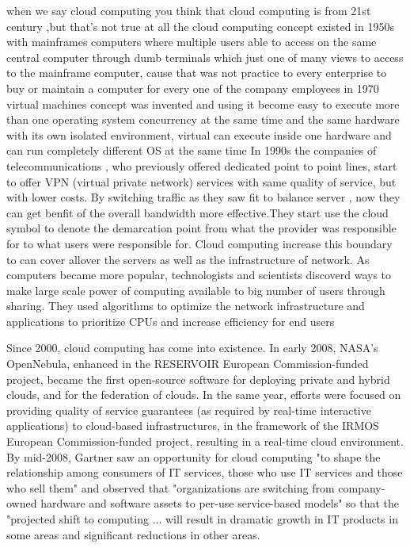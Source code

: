 \documentclass [12pt]{book}
\begin{document}
    
    when we say cloud computing you think that cloud computing is from 21st century ,but that's not true at all the cloud computing concept existed in 1950s with mainframes computers where multiple users able to access on the same central computer through dumb terminals which just one of many views to access to the mainframe computer, cause that was not practice to every enterprise to buy or maintain a computer for every one of the company employees 
  \newline
  \newline
  \newline
    in 1970 virtual machines concept was invented and using it become easy to execute more than one operating system concurrency at the same time and the same hardware with its own isolated environment, virtual can execute inside one hardware and can run completely different OS at the same time 
    \newline
    \newline
    \newline
    In 1990s the companies of  telecommunications , who previously offered  dedicated point to point lines, start to offer VPN  (virtual private network)  services with same quality of service, but with lower costs. By switching traffic as they saw fit to balance server , now they can get benfit of the overall bandwidth more effective.They start use the cloud symbol to denote the demarcation point from what the provider was responsible for to  what users were responsible for. Cloud computing increase this boundary to can  cover allover the servers as well as the  infrastructure of network. As computers became more popular, technologists and scientists discoverd ways to make large scale power of computing  available to big number of users through sharing. They used algorithms to optimize the network  infrastructure and applications to prioritize CPUs and increase efficiency for end users
    \newline
    \newline
    \newline
  
    
    
   
    
    Since 2000, cloud computing has come into existence. In early 2008, NASA's OpenNebula, enhanced in the RESERVOIR European Commission-funded project, became the first open-source software for deploying private and hybrid clouds, and for the federation of clouds. In the same year, efforts were focused on providing quality of service guarantees (as required by real-time interactive applications) to cloud-based infrastructures, in the framework of the IRMOS European Commission-funded project, resulting in a real-time cloud environment.  By mid-2008, Gartner saw an opportunity for cloud computing "to shape the relationship among consumers of IT services, those who use IT services and those who sell them" and observed that "organizations are switching from company-owned hardware and software assets to per-use service-based models" so that the "projected shift to computing ... will result in dramatic growth in IT products in some areas and significant reductions in other areas.
    
   
\end{document}
